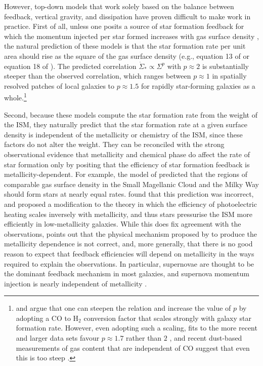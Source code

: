 \documentclass[useAMS,usenatbib]{mn2e}
\begin{document}
However, top-down models that work solely based on the balance between feedback, vertical gravity, and dissipation have proven difficult to make work in practice. First of all, unless one posits a source of star formation feedback for which the momentum injected per star formed increases with gas surface density \citep[e.g., as trapped infrared radiation pressure does in the model of][]{thompson05a}, the natural prediction of these models is that the star formation rate per unit area should rise as the square of the gas surface density (e.g., equation 13 of \citealt{ostriker11a} or equation 18 of \citealt{faucher-giguere13a}). The predicted correlation $\dot{\Sigma}_* \propto \Sigma^p$ with $p \approx 2$ is substantially steeper than the observed correlation, which ranges between $p\approx 1$ in spatially resolved patches of local galaxies to $p\approx 1.5$ for rapidly star-forming galaxies as a whole.\footnote{\citet{narayanan12a} and \citet{faucher-giguere13a} argue that one can steepen the relation and increase the value of $p$ by adopting a CO to H$_2$ conversion factor that scales strongly with galaxy star formation rate. However, even adopting such a scaling, fits to the more recent and larger data sets favour $p \approx 1.7$ rather than $2$ \citep[c.f.~figure 3 of][]{thompson16a}, and recent dust-based measurements of gas content that are independent of CO suggest that even this is too steep \citep{genzel15a}.}

Second, because these models compute the star formation rate from the weight of the ISM, they naturally predict that the star formation rate at a given surface density is independent of the metallicity or chemistry of the ISM, since these factors do not alter the weight. They can be reconciled with the strong observational evidence that metallicity and chemical phase do affect the rate of star formation only by positing  that the efficiency of star formation feedback is metallicity-dependent. For example, the model of \citet{ostriker10a} predicted that the regions of comparable gas surface density in the Small Magellanic Cloud and the Milky Way should form stars at nearly equal rates. \citet{bolatto11a} found that this prediction was incorrect, and proposed a modification to the theory in which the efficiency of photoelectric heating scales inversely with metallicity, and thus stars pressurise the ISM more efficiently in low-metallicity galaxies. While this does fix agreement with the observations, \citet{krumholz13c} points out that the physical mechanism proposed by \citet{bolatto11a} to produce the metallicity dependence is not correct, and, more generally, that there is no good reason to expect that feedback efficiencies will depend on metallicity in the ways required to explain the observations. In particular, supernovae are thought to be the dominant feedback mechanism in most galaxies, and supernova momentum injection is nearly independent of metallicity \citep[e.g.,][]{thornton98a, martizzi15a, gentry17a}.
\end{document}
